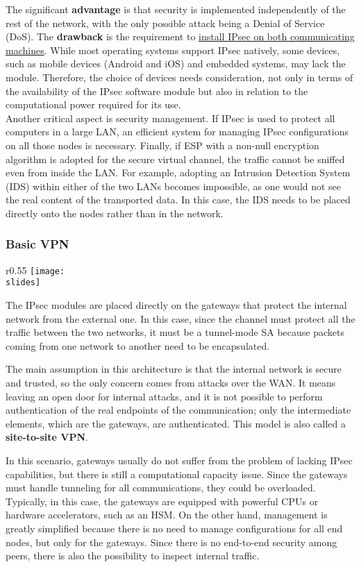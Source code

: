 The significant \textbf{advantage} is that security is implemented independently of the rest of the network, with the only possible attack being a Denial of Service (DoS). The \textbf{drawback} is the requirement to \ul{install IPsec on both communicating machines}. While most operating systems support IPsec natively, some devices, such as mobile devices (Android and iOS) and embedded systems, may lack the module. Therefore, the choice of devices needs consideration, not only in terms of the availability of the IPsec software module but also in relation to the computational power required for its use.\\
Another critical aspect is security management. If IPsec is used to protect all computers in a large LAN, an efficient system for managing IPsec configurations on all those nodes is necessary. Finally, if ESP with a non-null encryption algorithm is adopted for the secure virtual channel, the traffic cannot be sniffed even from inside the LAN. For example, adopting an Intrusion Detection System (IDS) within either of the two LANs becomes impossible, as one would not see the real content of the transported data. In this case, the IDS needs to be placed directly onto the nodes rather than in the network.

\subsubsection{Basic VPN}
\begin{wrapfigure}{r}{0.55\textwidth}
    \centering
    \texttt{[image: \\slides]}
\end{wrapfigure}
The IPsec modules are placed directly on the gateways that protect the internal network from the external one. In this case, since the channel must protect all the traffic between the two networks, it must be a tunnel-mode SA because packets coming from one network to another need to be encapsulated.

The main assumption in this architecture is that the internal network is secure and trusted, so the only concern comes from attacks over the WAN. It means leaving an open door for internal attacks, and it is not possible to perform authentication of the real endpoints of the communication; only the intermediate elements, which are the gateways, are authenticated. This model is also called a \textbf{site-to-site VPN}.

In this scenario, gateways usually do not suffer from the problem of lacking IPsec capabilities, but there is still a computational capacity issue. Since the gateways must handle tunneling for all communications, they could be overloaded. Typically, in this case, the gateways are equipped with powerful CPUs or hardware accelerators, such as an HSM. On the other hand, management is greatly simplified because there is no need to manage configurations for all end nodes, but only for the gateways. Since there is no end-to-end security among peers, there is also the possibility to inspect internal traffic.



